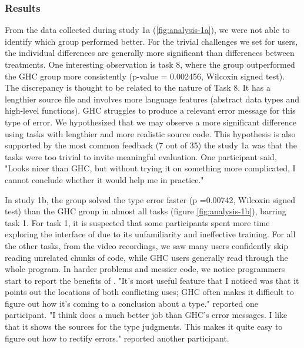 \subsubsection*{\textbf {Results}}

From the data collected during study 1a (\ref{fig:analysis-1a}), we were not able to identify which group performed better. For the trivial challenges we set for users, the individual differences are generally more significant than differences between treatments. One interesting observation is task 8, where the \chameleon{} group outperformed the GHC group more consistently (p-value = 0.002456, Wilcoxin signed test). The discrepancy is thought to be related to the nature of Task 8. It has a lengthier source file and involves more language features (abstract data types and high-level functions). GHC struggles to produce a relevant error message for this type of error. We hypothesized that we may observe a more significant difference using tasks with lengthier and more realistic source code. This hypothesis is also supported by the most common feedback (7 out of 35) the study 1a was that the tasks were too trivial to invite meaningful evaluation. One participant said, "Looks nicer than GHC, but without trying it on something more complicated, I cannot conclude whether it would help me in practice." 

In study 1b, the \chameleon{} group solved the type error faster (p =0.00742, Wilcoxin signed test) than the GHC group in almost all tasks (figure \ref{fig:analysis-1b}), barring task 1. For task 1, it is suspected that some participants spent more time exploring the interface of \chameleon{} due to its unfamiliarity and ineffective training. For all the other tasks, from the video recordings, we saw many \chameleon{} users confidently skip reading unrelated chunks of code, while GHC users generally read through the whole program. In harder problems and messier code, we notice programmers start to report the benefits of \chameleon{}. "It's most useful feature that I noticed was that it points out the locations of both conflicting uses; GHC often makes it difficult to figure out how it's coming to a conclusion about a type." reported one participant. "I think \chameleon{}  does a much better job than GHC's error messages. I like that it shows the sources for the type judgments. This makes it quite easy to figure out how to rectify errors." reported another participant.



